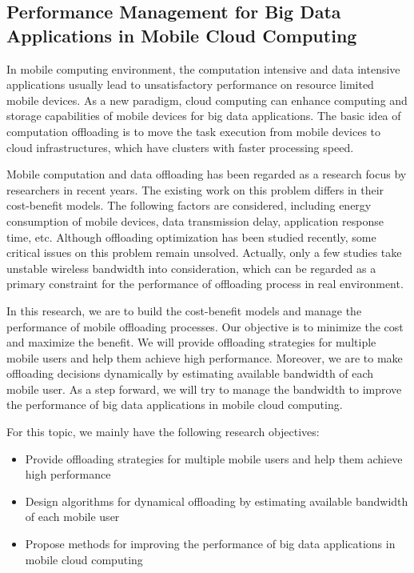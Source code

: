 \subsection{Performance Management for Big Data Applications in Mobile Cloud Computing}

In mobile computing environment, the computation intensive and data intensive applications usually lead to unsatisfactory performance on resource limited mobile devices. As a new paradigm, cloud computing can enhance computing and storage capabilities of mobile devices for big data applications. The basic idea of computation offloading is to move the task execution from mobile devices to cloud infrastructures, which have clusters with faster processing speed.

Mobile computation and data offloading has been regarded as a research focus by researchers in recent years. The existing work on this problem differs in their cost-benefit models. The following factors are considered, including energy consumption of mobile devices, data transmission delay, application response time, etc. Although offloading optimization has been studied recently, some critical issues on this problem remain unsolved. Actually, only a few studies take unstable wireless bandwidth into consideration, which can be regarded as a primary constraint for the performance of offloading process in real environment.

In this research, we are to build the cost-benefit models and manage the performance of mobile offloading processes. Our objective is to minimize the cost and maximize the benefit. We will provide offloading strategies for multiple mobile users and help them achieve high performance. Moreover, we are to make offloading decisions dynamically by estimating available bandwidth of each mobile user. As a step forward, we will try to manage the bandwidth to improve the performance of big data applications in mobile cloud computing.

For this topic, we mainly have the following research objectives:

\begin{itemize}
  \item Provide offloading strategies for multiple mobile users and help them achieve high performance
  \item Design algorithms for dynamical offloading by estimating available bandwidth of each mobile user
  \item Propose methods for improving the performance of big data applications in mobile cloud computing
\end{itemize}
